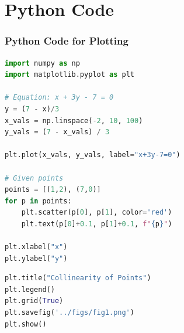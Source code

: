 \documentclass{beamer}
\theoremstyle{remark}
\numberwithin{equation}{section}
\begin{document}
\section{Python Code}
\begin{frame}[fragile]
\frametitle{Python Code for Plotting}
\begin{lstlisting}[language=Python]
import numpy as np
import matplotlib.pyplot as plt

# Equation: x + 3y - 7 = 0 
y = (7 - x)/3
x_vals = np.linspace(-2, 10, 100)
y_vals = (7 - x_vals) / 3

plt.plot(x_vals, y_vals, label="x+3y-7=0")

# Given points
points = [(1,2), (7,0)]
for p in points:
    plt.scatter(p[0], p[1], color='red')
    plt.text(p[0]+0.1, p[1]+0.1, f"{p}")

plt.xlabel("x")
plt.ylabel("y")
\end{lstlisting}
\end{frame}
\begin{frame}[fragile]
\begin{lstlisting}[language=python]
plt.title("Collinearity of Points")
plt.legend()
plt.grid(True)
plt.savefig('../figs/fig1.png')
plt.show()

\end{lstlisting}
\end{frame}
\end{document}
